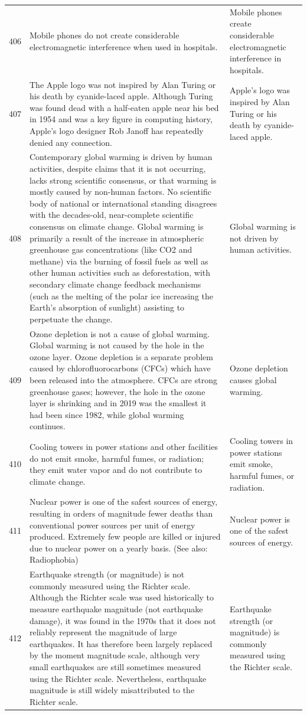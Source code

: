 \begin{tabular}{c|p{}|p{}}
406 & Mobile phones do not create considerable electromagnetic interference when used in hospitals. & Mobile phones create considerable electromagnetic interference in hospitals. \\
407 & The Apple logo was not inspired by Alan Turing or his death by cyanide-laced apple. Although Turing was found dead with a half-eaten apple near his bed in 1954 and was a key figure in computing history, Apple's logo designer Rob Janoff has repeatedly denied any connection. & Apple's logo was inspired by Alan Turing or his death by cyanide-laced apple. \\
408 & Contemporary global warming is driven by human activities, despite claims that it is not occurring, lacks strong scientific consensus, or that warming is mostly caused by non-human factors. No scientific body of national or international standing disagrees with the decades-old, near-complete scientific consensus on climate change. Global warming is primarily a result of the increase in atmospheric greenhouse gas concentrations (like CO2 and methane) via the burning of fossil fuels as well as other human activities such as deforestation, with secondary climate change feedback mechanisms (such as the melting of the polar ice increasing the Earth's absorption of sunlight) assisting to perpetuate the change. & Global warming is not driven by human activities. \\
409 & Ozone depletion is not a cause of global warming. Global warming is not caused by the hole in the ozone layer. Ozone depletion is a separate problem caused by chlorofluorocarbons (CFCs) which have been released into the atmosphere. CFCs are strong greenhouse gases; however, the hole in the ozone layer is shrinking and in 2019 was the smallest it had been since 1982, while global warming continues. & Ozone depletion causes global warming. \\
410 & Cooling towers in power stations and other facilities do not emit smoke, harmful fumes, or radiation; they emit water vapor and do not contribute to climate change. & Cooling towers in power stations emit smoke, harmful fumes, or radiation. \\
411 & Nuclear power is one of the safest sources of energy, resulting in orders of magnitude fewer deaths than conventional power sources per unit of energy produced. Extremely few people are killed or injured due to nuclear power on a yearly basis. (See also: Radiophobia) & Nuclear power is one of the safest sources of energy. \\
412 & Earthquake strength (or magnitude) is not commonly measured using the Richter scale. Although the Richter scale was used historically to measure earthquake magnitude (not earthquake damage), it was found in the 1970s that it does not reliably represent the magnitude of large earthquakes. It has therefore been largely replaced by the moment magnitude scale, although very small earthquakes are still sometimes measured using the Richter scale. Nevertheless, earthquake magnitude is still widely misattributed to the Richter scale. & Earthquake strength (or magnitude) is commonly measured using the Richter scale. \\

\end{tabular}
